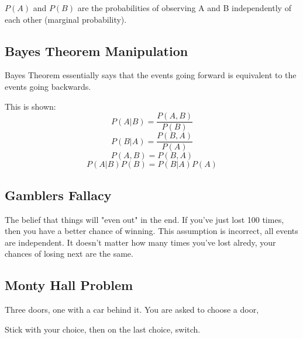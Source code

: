 \documentclass[11pt]{article}
\begin{document}
\(P(A)\) and \(P(B)\) are the probabilities of observing A and B
independently of each other (marginal probability).

\subsection{Bayes Theorem Manipulation}
\label{sec:orgcfd49f4}
Bayes Theorem essentially says that the events going forward is
equivalent to the events going backwards. 

This is shown:
$$P(A|B) = \frac{P(A,B)}{P(B)}$$
$$P(B|A) = \frac{P(B,A)}{P(A)}$$
$$P(A,B) = P(B,A)             $$
$$P(A|B)P(B) = P(B|A)P(A)     $$

\subsection{Gamblers Fallacy}
\label{sec:org80df7fa}
The belief that things will "even out" in the end. If you've just lost
100 times, then you have a better chance of winning. This assumption
is incorrect, all events are independent. It doesn't matter how many
times you've lost alredy, your chances of losing next are the same. 

\subsection{Monty Hall Problem}
\label{sec:orgd48d985}
Three doors, one with a car behind it. You are asked to choose a door, 

Stick with your choice, then on the last choice, switch.
\end{document}
